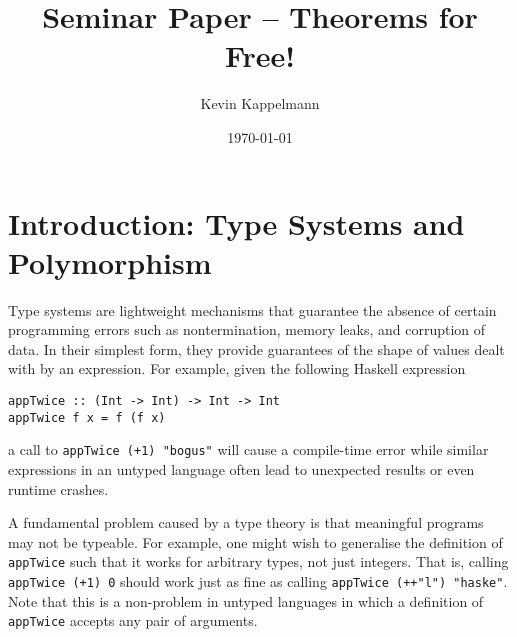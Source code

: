 \documentclass[12pt]{article}
\title{\textbf{Seminar Paper -- Theorems for Free!}}
\author{Kevin Kappelmann}
\affil{Chair for Logic and Verification}
\date{\today}
\theoremstyle{plain}
\theoremstyle{definition}
\begin{document}
\maketitle

\tableofcontents

\newpage
{}

\section{Introduction: Type Systems and Polymorphism}
Type systems are lightweight mechanisms that guarantee the absence of certain programming errors
such as nontermination, memory leaks, and corruption of data.
In their simplest form, they provide guarantees of the shape of values dealt with by an expression.
For example, given the following Haskell expression
\begin{verbatim}
appTwice :: (Int -> Int) -> Int -> Int
appTwice f x = f (f x)
\end{verbatim}
a call to \texttt{appTwice (+1) "bogus"} will cause a compile-time error while
similar expressions in an untyped language often lead to unexpected results
or even runtime crashes.

A fundamental problem caused by a type theory is that meaningful programs may not be typeable.
For example, one might wish to generalise the definition of \texttt{appTwice} such that it works for arbitrary types, not just integers.
That is, calling \texttt{appTwice (+1) 0}
should work just as fine as calling
\texttt{appTwice (++"l") "haske"}.
Note that this is a non-problem in untyped languages in which a definition of \texttt{appTwice} accepts any pair of arguments.
\end{document}
